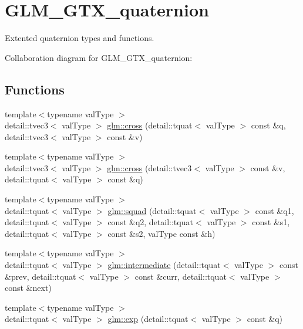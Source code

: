 \hypertarget{group__gtx__quaternion}{}\section{G\+L\+M\+\_\+\+G\+T\+X\+\_\+quaternion}
\label{group__gtx__quaternion}


Extented quaternion types and functions.  


Collaboration diagram for G\+L\+M\+\_\+\+G\+T\+X\+\_\+quaternion\+:
\subsection*{Functions}
\begin{DoxyCompactItemize}
\item 
{\footnotesize template$<$typename val\+Type $>$ }\\detail\+::tvec3$<$ val\+Type $>$ \hyperlink{group__gtx__quaternion_ga57df84905f34b0d884ff5e2ac9a4d776}{glm\+::cross} (detail\+::tquat$<$ val\+Type $>$ const \&q, detail\+::tvec3$<$ val\+Type $>$ const \&v)
\item 
{\footnotesize template$<$typename val\+Type $>$ }\\detail\+::tvec3$<$ val\+Type $>$ \hyperlink{group__gtx__quaternion_gacd88ee5f0938469119199bdb216c68a1}{glm\+::cross} (detail\+::tvec3$<$ val\+Type $>$ const \&v, detail\+::tquat$<$ val\+Type $>$ const \&q)
\item 
{\footnotesize template$<$typename val\+Type $>$ }\\detail\+::tquat$<$ val\+Type $>$ \hyperlink{group__gtx__quaternion_ga3e9e70938d0e5528edddadb175f8eda4}{glm\+::squad} (detail\+::tquat$<$ val\+Type $>$ const \&q1, detail\+::tquat$<$ val\+Type $>$ const \&q2, detail\+::tquat$<$ val\+Type $>$ const \&s1, detail\+::tquat$<$ val\+Type $>$ const \&s2, val\+Type const \&h)
\item 
{\footnotesize template$<$typename val\+Type $>$ }\\detail\+::tquat$<$ val\+Type $>$ \hyperlink{group__gtx__quaternion_gadf15938f0260ed8894cc39be603fc4e9}{glm\+::intermediate} (detail\+::tquat$<$ val\+Type $>$ const \&prev, detail\+::tquat$<$ val\+Type $>$ const \&curr, detail\+::tquat$<$ val\+Type $>$ const \&next)
\item 
{\footnotesize template$<$typename val\+Type $>$ }\\detail\+::tquat$<$ val\+Type $>$ \hyperlink{group__gtx__quaternion_gaadefe537560bc9af6b6a7af1aea83eaf}{glm\+::exp} (detail\+::tquat$<$ val\+Type $>$ const \&q)

\end{DoxyCompactItemize}
